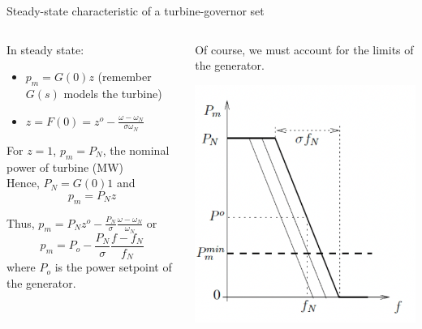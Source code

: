 \begin{frame}{Steady-state characteristic of a turbine-governor set}
      \begin{columns}
    \begin{column}{0.65\textwidth}


    In steady state:
    \begin{itemize}
      \item $p_m = G(0)z$ (remember $G(s)$ models the turbine) 
      \item $z = F(0) = z^o - \frac{\omega - \omega_N}{\sigma \omega_N}$ 
    \end{itemize}
    For $z = 1$, $p_m = P_N$, the nominal power of turbine (MW) \\ 
    Hence, $P_N = G(0) 1$  and $$p_m = P_N z$$ 
    
    Thus, $p_m = P_N z^o - \frac{P_N}{\sigma} \frac{\omega - \omega_N}{\omega_N}$
    or $$p_m = P_o - \frac{P_N}{\sigma} \frac{f - f_N}{f_N}$$
    where $P_o$ is the power setpoint of the generator.
    
    \end{column}
    \begin{column}{0.33\textwidth}

        Of course, we must account for the limits of the generator.
        \begin{center}  
          \includegraphics[width=\textwidth]{images/generator_droop_steady_state.png} %
        \end{center}
          
    \end{column}
    \end{columns}
\end{frame}


